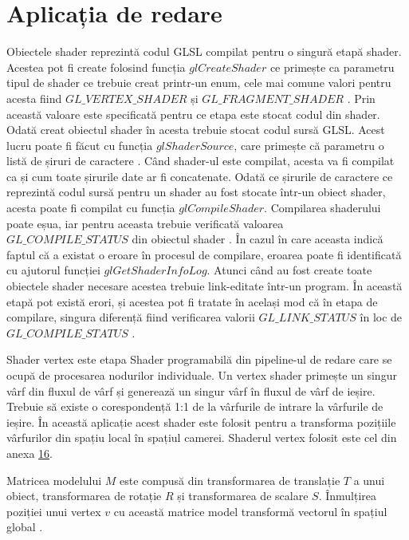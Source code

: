 \section{Aplicația de redare}

Obiectele shader reprezintă codul GLSL compilat pentru o singură etapă shader. Acestea pot fi create folosind funcția $glCreateShader$ ce primește ca parametru tipul de shader ce trebuie creat printr-un enum, cele mai comune valori pentru acesta fiind $GL\_VERTEX\_SHADER$ și $GL\_FRAGMENT\_SHADER$ \cite{openglreference}. Prin această valoare este specificată pentru ce etapa este stocat codul din shader. Odată creat obiectul shader în acesta trebuie stocat codul sursă GLSL. Acest lucru poate fi făcut cu funcția $glShaderSource$, care primește că parametru o listă de șiruri de caractere \cite{openglreference}. Când shader-ul este compilat, acesta va fi compilat ca și cum toate șirurile date ar fi concatenate. Odată ce șirurile de caractere ce reprezintă codul sursă pentru un shader au fost stocate într-un obiect shader, acesta poate fi compilat cu funcția $glCompileShader$. Compilarea shaderului poate eșua, iar pentru aceasta trebuie verificată valoarea $GL\_COMPILE\_STATUS$ din obiectul shader \cite{openglreference}. În cazul în care aceasta indică faptul că a existat o eroare în procesul de compilare, eroarea poate fi identificată cu ajutorul funcției $glGetShaderInfoLog$. Atunci când au fost create toate obiectele shader necesare acestea trebuie link-editate într-un program. În această etapă pot există erori, și acestea pot fi tratate în același mod că în etapa de compilare, singura diferență fiind verificarea valorii $GL\_LINK\_STATUS$ în loc de $GL\_COMPILE\_STATUS$ \cite{openglreference}.

Shader vertex este etapa Shader programabilă din pipeline-ul de redare care se ocupă de procesarea nodurilor individuale. Un vertex shader primește un singur vârf din fluxul de vârf și generează un singur vârf în fluxul de vârf de ieșire. Trebuie să existe o corespondență 1:1 de la vârfurile de intrare la vârfurile de ieșire. În această aplicație acest shader este folosit pentru a transforma pozițiile vârfurilor din spațiu local în spațiul camerei. Shaderul vertex folosit este cel din anexa \hyperref[appendix:16_raycasting_vert]{16}.

Matricea modelului $M$ este compusă din transformarea de translație $T$ a unui obiect, transformarea de rotație $R$ și transformarea de scalare $S$. Înmulțirea poziției unui vertex $v$ cu această matrice model transformă vectorul în spațiul global \cite{LearnOpenGL}.

